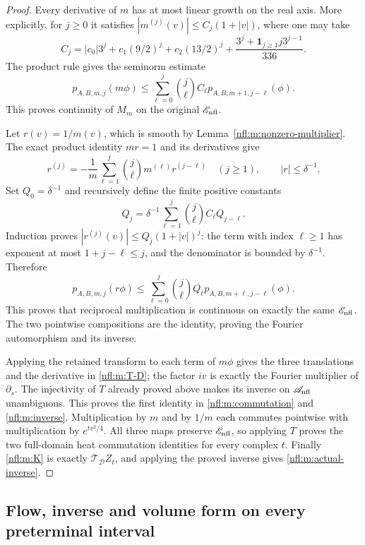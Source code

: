 \begin{proof}
Every derivative of \(m\) has at most linear growth on the real
axis. More explicitly, for \(j\geq0\) it satisfies
\( |m^{(j)}(v)|\leq C_j(1+|v|)\), where one may take
\[
C_j=|c_0|3^j+c_1(9/2)^j+c_2(13/2)^j
       +\frac{3^j+\mathbf1_{j\geq1}j3^{j-1}}{336}.
\]
The product rule gives the seminorm estimate
\[
p_{A,B,m,j}(m\phi)
 \leq\sum_{\ell=0}^j\binom j\ell C_\ell
                     p_{A,B,m+1,j-\ell}(\phi).
\]
This proves continuity of \(M_m\) on the original \(\mathscr E_{\rm nfl}\).

Let \(r(v)=1/m(v)\), which is smooth by
Lemma~\ref{nfl:m:nonzero-multiplier}. The exact product identity
\(mr=1\) and its derivatives give
\[
r^{(j)}=-\frac1m\sum_{\ell=1}^j
                 \binom j\ell m^{(\ell)}r^{(j-\ell)}
\quad(j\geq1),\qquad |r|\leq\delta^{-1}.
\]
Set \(Q_0=\delta^{-1}\) and recursively define the finite
positive constants
\[
Q_j=\delta^{-1}\sum_{\ell=1}^j
                      \binom j\ell C_\ell Q_{j-\ell}.
\]
Induction proves
\(|r^{(j)}(v)|\leq Q_j(1+|v|)^j\): the term with index
\(\ell\geq1\) has exponent at most
\(1+j-\ell\leq j\), and the denominator is bounded by
\(\delta^{-1}\). Therefore
\[
p_{A,B,m,j}(r\phi)
 \leq\sum_{\ell=0}^j\binom j\ell Q_\ell
                         p_{A,B,m+\ell,j-\ell}(\phi).
\]
This proves that reciprocal multiplication is continuous on
exactly the same \(\mathscr E_{\rm nfl}\). The two pointwise compositions are
the identity, proving the Fourier automorphism and its inverse.

Applying the retained transform to each term of \(m\phi\)
gives the three translations and the derivative in
\eqref{nfl:m:T-D}; the factor \(iv\) is exactly the Fourier
multiplier of \(\partial_s\). The injectivity of \(T\) already
proved above makes its inverse on \(\mathscr A_{\rm nfl}\) unambiguous. This
proves the first identity in \eqref{nfl:m:commutation} and
\eqref{nfl:m:inverse}. Multiplication by \(m\) and by \(1/m\)
each commutes pointwise with multiplication by
\(e^{tv^2/4}\). All three maps preserve \(\mathscr E_{\rm nfl}\), so applying
\(T\) proves the two full-domain heat commutation identities
for every complex \(t\). Finally \eqref{nfl:m:K} is exactly
\(\mathcal T_{\mathcal D}Z_t\), and applying the proved inverse
gives \eqref{nfl:m:actual-inverse}.
\end{proof}


\subsection{Flow, inverse and volume form on every preterminal interval}

